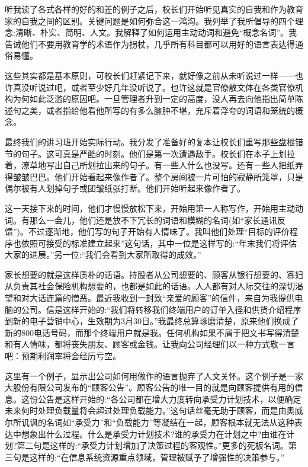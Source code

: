 听我读了各式各样的好的和差的例子之后，校长们开始听见真实的自我和作为教育家的自我之间的区别。关键问题是如何弥合这一鸿沟。我列举了我所倡导的四个理念:清晰、朴实、简明、人文。我解释了如何运用主动动词和避免“概念名词”。我告诫他们不要用教育学的术语作为拐杖，几乎所有科目都可以用好的语言表达得通俗易懂。

这些其实都是基本原则，可校长们赶紧记下来，就好像之前从未听说过一样——也许真没听说过吧，或者至少好几年没听说了。也许这就是官僚散文体在各类官僚机构为何如此泛滥的原因吧。一旦管理者升到一定的高度，没人再去向他指出简单陈述句之美，或者指给他看他所写的有多么臃肿不堪，充斥着浮夸的词语和笼统的概念。

最终我们的讲习班开始实际行动。我分发了准备好的复本让校长们重写那些盘根错节的句子。这可真是严酷的时刻。他们是第一次遭遇敌手。校长们在本子上划拉着，潦草地写出自己所划拉出来的句子。有一些人什么也没写。还有一些人把纸弄得皱皱巴巴。他们开始看起来像作者了。整个房间被一片可怕的寂静所笼罩，只是偶尔被有人划掉句子或团皱纸张打断。他们开始听起来像作者了。

这一天接下来的时间，他们才慢慢放松下来，开始用第一人称写作，开始用主动动词。有那么一会儿，他们还是放不下冗长的词语和模糊的名词(如“家长通讯反馈”)。不过逐渐地，他们写的句子开始有人情味了。我叫他们处理“目标的评价程序也依照可接受的标准建立起来”这句话，其中一位是这样写的:“年末我们将评估大家的进展。”另一位:“我们会看到大家所取得的成效。”

家长想要的就是这样质朴的话语。持股者从公司想要的、顾客从银行想要的、寡妇从负责其社会保险机构想要的，也都是如此的话语。人人都有对人际交往的深切渴望和对大话连篇的憎恶。最近我收到一封致“亲爱的顾客”的信件，来自为我提供电脑的公司。信是这样开始的:“我们将转移我们终端用户的订单入径和供货介绍程序到新的电子营销中心，生效期为3月30日。”我最终总算琢磨清楚，原来他们换成了新的800电话号码，而那个终端用户就是我。任何机构如果不屑于把文书写得清楚和有人情味，都将丧失朋友、顾客或金钱。让我向公司经理们以一种方式敬一言吧：预期利润率将会经历亏空。

这里有一个例子，显示出公司如何用做作的语言抛弃了人文关怀。这个例子是一家大股份有限公司发布的“顾客公告”。顾客公告的唯一目的就是向顾客提供有用的信息。这份公告是这样开始的:“各公司都在增大力度转向承受力计划技术，以便确定未来何时处理负载量将会超过处理负载能力。”这句话丝毫无助于顾客，而是由奥威尔所讥讽的名词如“承受力”和“负载能力”等凝结在一起，顾客根本就无法从这种表达中想象出什么过程。什么是承受力计划技术?谁的承受力在计划之中?由谁在计划?第二句是这样的:“承受力计划增加了决策过程的客观性。”更多的死板名词。第三句是这样的:“在信息系统资源重点领域，管理被赋予了增强性的决策参与。”

